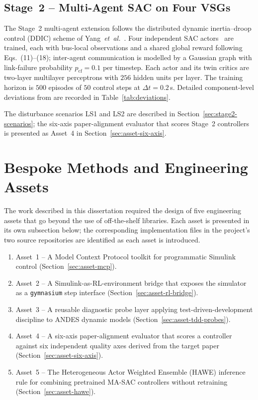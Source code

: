 \documentclass{unnc-fyp}
\begin{document}
\subsection{Stage~2 -- Multi-Agent SAC on Four VSGs}

The Stage~2 multi-agent extension follows the distributed
dynamic inertia--droop control (DDIC) scheme of
Yang~\emph{et~al.}~\cite{yang2023ddic}.
Four independent SAC actors~\cite{haarnoja2018sac} are trained,
each with bus-local observations and a shared global reward
following~\cite{yang2023ddic} Eqs.~(11)--(18); inter-agent
communication is modelled by a Gaussian graph with link-failure
probability $p_{\mathrm{cf}} = 0.1$ per timestep.
Each actor and its twin critics are two-layer multilayer
perceptrons with $256$ hidden units per layer.
The training horizon is $500$ episodes of $50$ control steps at
$\Delta t = 0.2$\,s.
Detailed component-level deviations from
\cite{yang2023ddic} are recorded in
Table~\ref{tab:deviations}.

The disturbance scenarios LS1 and LS2 are described in
Section~\ref{sec:stage2-scenarios}; the six-axis paper-alignment
evaluator that scores Stage~2 controllers is presented as
Asset~4 in Section~\ref{sec:asset-six-axis}.

\section{Bespoke Methods and Engineering Assets}
\label{sec:bespoke}

The work described in this dissertation required the design of five
engineering assets that go beyond the use of off-the-shelf libraries.
Each asset is presented in its own subsection below; the corresponding
implementation files in the project's two source repositories are
identified as each asset is introduced.

\begin{enumerate}
  \item Asset~1 -- A Model Context Protocol toolkit for programmatic
        Simulink control (Section~\ref{sec:asset-mcp}).
  \item Asset~2 -- A Simulink-as-RL-environment bridge that exposes
        the simulator as a \texttt{gymnasium} step interface
        (Section~\ref{sec:asset-rl-bridge}).
  \item Asset~3 -- A reusable diagnostic probe layer applying
        test-driven-development discipline to ANDES dynamic models
        (Section~\ref{sec:asset-tdd-probes}).
  \item Asset~4 -- A six-axis paper-alignment evaluator that scores
        a controller against six independent quality axes derived
        from the target paper (Section~\ref{sec:asset-six-axis}).
  \item Asset~5 -- The Heterogeneous Actor Weighted Ensemble (HAWE)
        inference rule for combining pretrained MA-SAC controllers
        without retraining (Section~\ref{sec:asset-hawe}).
\end{enumerate}
\end{document}
